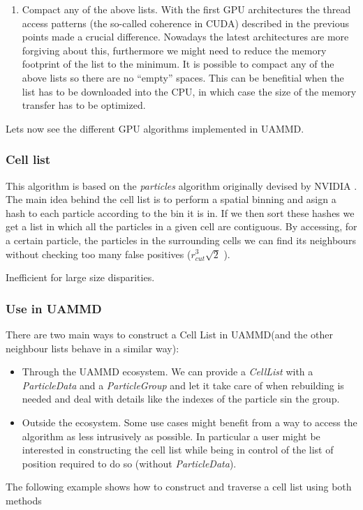 \documentclass[ twoside,openright,titlepage,numbers=noenddot,%
headinclude,footinclude,cleardoublepage=empty,abstract=on,
BCOR=5mm,paper=a4,fontsize=11pt, dvipsnames
]{scrreprt}
\newcommand{\uammd}{\gls{UAMMD}\xspace}
\newcommand{\gpu}{\gls{GPU}\xspace}
\begin{document}
\begin{enumerate}
\item Compact any of the above lists.
  With the first \gpu architectures the thread access patterns (the so-called coherence in CUDA) described in the previous points made a crucial difference. Nowadays the latest architectures are more forgiving about this, furthermore we might need to reduce the memory footprint of the list to the minimum. It is possible to compact any of the above lists so there are no ``empty'' spaces. This can be benefitial when the list has to be downloaded into the CPU, in which case the size of the memory transfer has to be optimized.
\end{enumerate}

Lets now see the different \gpu algorithms implemented in \uammd.

\subsubsection{Cell list}\label{sec:celllist}

This algorithm is based on the \emph{particles} algorithm originally devised by NVIDIA \cite{gpugems3}.
The main idea behind the cell list is to perform a spatial binning and asign a hash to each particle according to the bin it is in. If we then sort these hashes we get a list in which all the particles in a given cell are contiguous. By accessing, for a certain particle, the particles in the surrounding cells we can find its neighbours without checking too many false positives ($r_{cut}^3\sqrt{2}$ ).

Inefficient for large size disparities.
\subsubsection{Use in UAMMD}
There are two main ways to construct a Cell List in \uammd (and the other neighbour lists behave in a similar way):
\begin{itemize}
\item Through the \uammd ecosystem.
  We can provide a \emph{CellList} with a \emph{ParticleData} and a \emph{ParticleGroup} and let it take care of when rebuilding is needed and deal with details like the indexes of the particle sin the group.
\item Outside the ecosystem.
  Some use cases might benefit from a way to access the algorithm as less intrusively as possible. In particular a user might be interested in constructing the cell list while being in control of the list of position required to do so (without \emph{ParticleData}).
\end{itemize}
The following example shows how to construct and traverse a cell list using both methods
\end{document}
